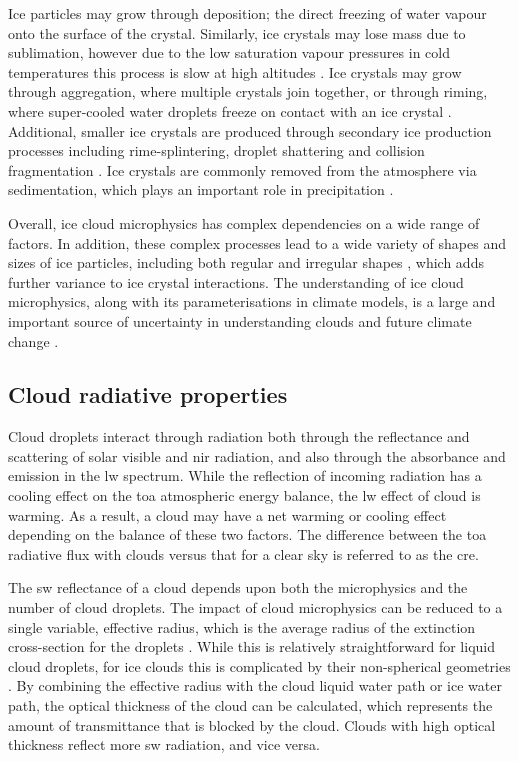 Ice particles may grow through deposition; the direct freezing of water vapour onto the surface of the crystal.
Similarly, ice crystals may lose mass due to sublimation, however due to the low saturation vapour pressures in cold temperatures this process is slow at high altitudes \citep{seeley_formation_2019}.
Ice crystals may grow through aggregation, where multiple crystals join together, or through riming, where super-cooled water droplets freeze on contact with an ice crystal \citep{taylor_observations_2016}.
Additional, smaller ice crystals are produced through secondary ice production processes including rime-splintering, droplet shattering and collision fragmentation \citep{field_secondary_2017a}.
Ice crystals are commonly removed from the atmosphere via sedimentation, which plays an important role in precipitation \citep{mulmenstadt_frequency_2015}.

Overall, ice cloud microphysics has complex dependencies on a wide range of factors.
In addition, these complex processes lead to a wide variety of shapes and sizes of ice particles, including both regular and irregular shapes \citep{waitz_situ_2022}, which adds further variance to ice crystal interactions.
The understanding of ice cloud microphysics, along with its parameterisations in climate models, is a large and important source of uncertainty in understanding clouds and future climate change \citep{sullivan_ice_2021, gasparini_opinion_2023}.


\subsection{Cloud radiative properties}

Cloud droplets interact through radiation both through the reflectance and scattering of solar visible and \acrfull{nir} radiation, and also through the absorbance and emission in the \acrshort{lw} spectrum.
While the reflection of incoming radiation has a cooling effect on the \acrfull{toa} atmospheric energy balance, the \acrshort{lw} effect of cloud is warming.
As a result, a cloud may have a net warming or cooling effect depending on the balance of these two factors.
The difference between the \acrshort{toa} radiative flux with clouds versus that for a clear sky is referred to as the \acrshort{cre}.

The \acrshort{sw} reflectance of a cloud depends upon both the microphysics and the number of cloud droplets.
The impact of cloud microphysics can be reduced to a single variable, effective radius, which is the average radius of the extinction cross-section for the droplets \citep{liou_radiation_1992}.
While this is relatively straightforward for liquid cloud droplets, for ice clouds this is complicated by their non-spherical geometries \citep{wyser_effective_1998}.
By combining the effective radius with the cloud liquid water path or ice water path, the optical thickness of the cloud can be calculated, which represents the amount of transmittance that is blocked by the cloud.
Clouds with high optical thickness reflect more \acrshort{sw} radiation, and vice versa.

